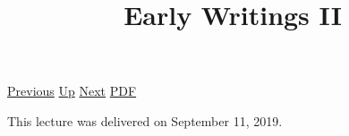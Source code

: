 \documentclass[12pt,a4paper]{report}
\begin{document}
 \href{doc/phil/People/Brandom/OnSellars/2019/EarlyWritingsI.html}{Previous} 
 \href{doc/phil/People/Brandom/OnSellars/2019.html}{Up} 
 \href{doc/phil/People/Brandom/OnSellars/2019/EmpiricismandthePhilosophyofMind.html}{Next} 
 \href{doc/phil/People/Brandom/OnSellars/2019/EarlyWritingsII.pdf}{PDF} 
\title{Early Writings II}

\tableofcontents
This lecture was delivered on September 11, 2019.
\end{document}
